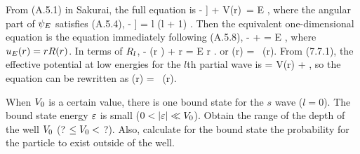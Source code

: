 \begin{solution}
	From (A.5.1) in Sakurai, the full {\Schrodinger} equation is
	\beq
		- \left[ \frac{1}{r^2} \pdv{r} \left( r^2 \pdv{\psiE}{r} \right) + \frac{1}{r^2 \sin\tht} \pdv{\tht} \left( \sin\tht \pdv{\psiE}{\tht} \right) + \frac{1}{r^2 \sin^2\tht} \pdv[2]{\psiE}{\phi} \right] + V(r) \,\psiE = E \psiE,
	\eeq
	where the angular part of $\psi_E$ satisfies (A.5.4),
	\beq
		-\left[ \frac{1}{\sin\tht} \pdv{}{\tht} \left( \sin\tht \pdv{}{\tht} \right) + \frac{1}{\sin^2\tht} \pdv[2]{}{\phi} \right] \Ylm = l (l + 1) \Ylm.
	\eeq
	Then the equivalent one-dimensional {\Schrodinger} equation is the equation immediately following (A.5.8),
	\beqn \label{schrod}
		-  +  \uE = E \uE,
	\eeqn
	where $u_E(r) = r R(r)$.  In terms of $R_l$,
	\beq
		-  (r \Rl) +  r \Rl = E r \Rl.
	\eeq
	or
	\beq
		  \Rl(r) = \El \, \Rl(r).
	\eeq
	From (7.7.1), the effective potential at low energies for the $l$th partial wave is
	\beq
		\Veff = V(r) +  \frac{l (l + 1)}{r^2},
	\eeq
	so the {\Schrodinger} equation can be rewritten as
	\beq
		 \Rl(r) = \El \, \Rl(r).
	\eeq
	\vfix
\end{solution}

\begin{problem} \label{2.2}
	When $V_0$ is a certain value, there is one bound state for the $s$ wave ($l = 0$).  The bound state energy $\varepsilon$ is small ($0 < \abs{\varepsilon} \ll V_0$).  Obtain the range of the depth of the well $V_0$ (? $\leq V_0 <$ ?).  Also, calculate for the bound state the probability for the particle to exist outside of the well.
\end{problem}

